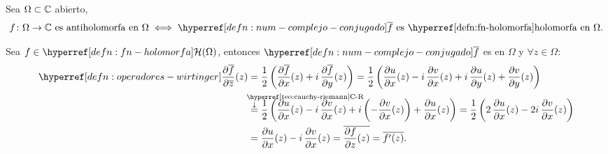 \begin{defn}\label{defn:fn-antiholomorfa}
    Sea $\Omega \subset \mathbb{C}$ abierto,
    \[
    f \colon \Omega \to \C \tex{ es antiholomorfa en }\Omega \iff \exhyperref[defn:num-complejo-conjugado]{num-complejo-conjugado}{\bar{f}} \tex{ es \exhyperref[defn:fn-holomorfa]{fn-holomorfa}{holomorfa} en } \Omega. 
    \]
\end{defn}

\begin{obs}\label{obs:holomorfa-conjugada-antiholomorfa}
    Sea $f \in \exhyperref[defn:fn-holomorfa]{fn-holomorfa}{\mathcal{H}}(\Omega)$, entonces $\exhyperref[defn:num-complejo-conjugado]{num-complejo-conjugado}{\bar{f}}$ es  en $\Omega$ y $\forall z \in \Omega :$
    \[
    \begin{aligned}
        \exhyperref[defn:operadores-wirtinger]{operadores-wirtinger}{\pdv{\bar{f}}{\bar{z}}}(z) &= \frac{1}{2} \left(\pdv{\bar{f}}{x}(z) + i \, \pdv{\bar{f}}{y}(z)\right) = \frac{1}{2} \left(\pdv{u}{x}(z) - i \, \pdv{v}{x}(z) + i \, \pdv{u}{y}(z) + \pdv{v}{y}(z)\right) \\
        &\upexpl{=}{\exhyperref[teo:cauchy-riemann]{teo-cauchy-riemann}{C-R}} \frac{1}{2} \left(\pdv{u}{x}(z) - i \, \pdv{v}{x}(z) + i \left(-\pdv{v}{x}(z)\right) + \pdv{u}{x}(z)\right) = \frac{1}{2} \left(2 \, \pdv{u}{x}(z) - 2 i \, \pdv{v}{x}(z)\right) \\
        &= \pdv{u}{x}(z) - i \, \pdv{v}{x}(z) = \bar{\pdv{f}{z}(z)} = \bar{f'(z)}.
    \end{aligned}
    \]
\end{obs}

